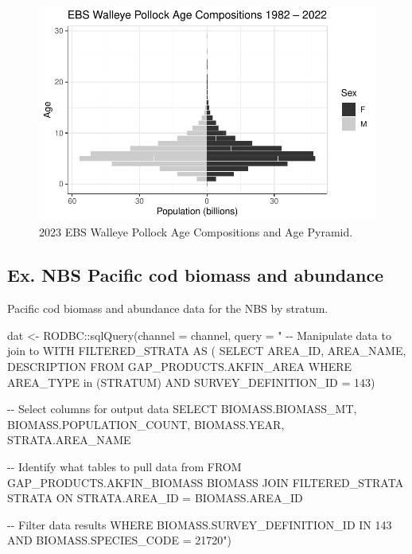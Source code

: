 \documentclass[
  letterpaper,
  oneside,
  open=any]{scrbook}
\newenvironment{Shaded}{\begin{snugshade}}{\end{snugshade}}
\newcommand{\AttributeTok}[1]{\textcolor[rgb]{0.40,0.45,0.13}{#1}}
\newcommand{\FunctionTok}[1]{\textcolor[rgb]{0.28,0.35,0.67}{#1}}
\newcommand{\NormalTok}[1]{\textcolor[rgb]{0.00,0.23,0.31}{#1}}
\newcommand{\OtherTok}[1]{\textcolor[rgb]{0.00,0.23,0.31}{#1}}
\newcommand{\SpecialCharTok}[1]{\textcolor[rgb]{0.37,0.37,0.37}{#1}}
\newcommand{\StringTok}[1]{\textcolor[rgb]{0.13,0.47,0.30}{#1}}
\begin{document}
\begin{figure}[H]

{\centering \includegraphics{content/akfin-oracle-sql-r_files/figure-pdf/test-3-plot-1.pdf}

}

\caption{2023 EBS Walleye Pollock Age Compositions and Age Pyramid.}

\end{figure}

\hypertarget{ex.-nbs-pacific-cod-biomass-and-abundance}{%
\subsection{Ex. NBS Pacific cod biomass and
abundance}\label{ex.-nbs-pacific-cod-biomass-and-abundance}}

Pacific cod biomass and abundance data for the NBS by stratum.

\begin{Shaded}
\begin{Highlighting}[]
\NormalTok{dat }\OtherTok{\textless{}{-}}\NormalTok{ RODBC}\SpecialCharTok{::}\FunctionTok{sqlQuery}\NormalTok{(}\AttributeTok{channel =}\NormalTok{ channel, }
                       \AttributeTok{query =} 
                         \StringTok{"}
\StringTok{{-}{-} Manipulate data to join to}
\StringTok{WITH FILTERED\_STRATA AS (}
\StringTok{SELECT }
\StringTok{AREA\_ID, }
\StringTok{AREA\_NAME, }
\StringTok{DESCRIPTION }
\StringTok{FROM GAP\_PRODUCTS.AKFIN\_AREA}
\StringTok{WHERE AREA\_TYPE in (\textquotesingle{}STRATUM\textquotesingle{}) AND }
\StringTok{SURVEY\_DEFINITION\_ID = 143) }

\StringTok{{-}{-} Select columns for output data}
\StringTok{SELECT }
\StringTok{BIOMASS.BIOMASS\_MT, }
\StringTok{BIOMASS.POPULATION\_COUNT, }
\StringTok{BIOMASS.YEAR, }
\StringTok{STRATA.AREA\_NAME}

\StringTok{{-}{-} Identify what tables to pull data from}
\StringTok{FROM GAP\_PRODUCTS.AKFIN\_BIOMASS BIOMASS }
\StringTok{JOIN FILTERED\_STRATA STRATA }
\StringTok{ON STRATA.AREA\_ID = BIOMASS.AREA\_ID}

\StringTok{{-}{-} Filter data results}
\StringTok{WHERE BIOMASS.SURVEY\_DEFINITION\_ID IN 143 }
\StringTok{AND BIOMASS.SPECIES\_CODE = 21720"}\NormalTok{)}
\end{Highlighting}
\end{Shaded}
\end{document}
